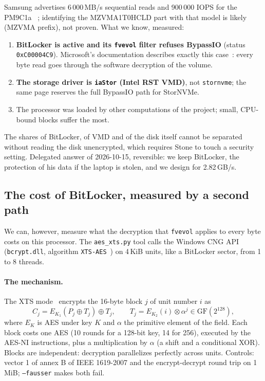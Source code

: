 Samsung advertises 6\,000\,MB/s sequential reads and 900\,000 IOPS for the PM9C1a \litt~\cite{samsung2023pm9c1a,storagereview2023pm9c1a}; identifying the MZVMA1T0HCLD part with that model is likely (MZVMA prefix), not proven. What we know, measured:
\begin{enumerate}
\item \textbf{BitLocker is active and its \texttt{fvevol} filter refuses BypassIO} (status \texttt{0xC00004C9}). Microsoft's documentation describes exactly this case~\cite{microsoft2025bypassio}: every byte read goes through the software decryption of the volume.
\item \textbf{The storage driver is \texttt{iaStor} (Intel RST VMD)}, not \texttt{stornvme}; the same page reserves the full BypassIO path for StorNVMe.
\item The processor was loaded by other computations of the project; small, CPU-bound blocks suffer the most.
\end{enumerate}
The shares of BitLocker, of VMD and of the disk itself cannot be separated without reading the disk unencrypted, which requires Stone to touch a security setting. Delegated answer of 2026-10-15, reversible: we keep BitLocker, the protection of his data if the laptop is stolen, and we design for 2.82\,GB/s.

\subsection{The cost of BitLocker, measured by a second path}\label{sec:bitlocker}

We can, however, measure what the decryption that \texttt{fvevol} applies to every byte costs on this processor. The \texttt{aes\_xts.py} tool calls the Windows CNG API (\texttt{bcrypt.dll}, algorithm \texttt{XTS-AES}~\cite{microsoft2026cngalg}) on 4\,KiB units, like a BitLocker sector, from 1 to 8 threads.

\paragraph{The mechanism.} The XTS mode~\cite{ieee2008xts} encrypts the 16-byte block $j$ of unit number $i$ as
\begin{equation}\label{eq:xts}
C_j = E_{K_1}(P_j \oplus T_j) \oplus T_j, \qquad T_j = E_{K_2}(i) \otimes \alpha^{j} \in \mathrm{GF}(2^{128}),
\end{equation}
where $E_K$ is AES under key $K$ and $\alpha$ the primitive element of the field. Each block costs one AES (10 rounds for a 128-bit key, 14 for 256), executed by the AES-NI instructions, plus a multiplication by $\alpha$ (a shift and a conditional XOR). Blocks are independent: decryption parallelizes perfectly across units. Controls: vector 1 of annex B of IEEE 1619-2007 and the encrypt-decrypt round trip on 1\,MiB; \texttt{--fausser} makes both fail.

